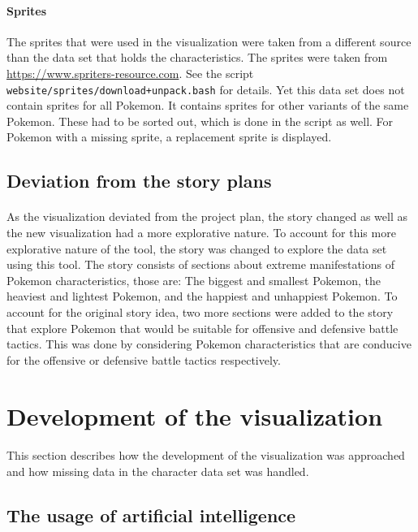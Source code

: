 \documentclass[12pt, a4paper]{article}
\begin{document}
			\paragraph{Sprites}
				The sprites that were used in the visualization were taken from a different source than the data set that holds the characteristics. The sprites were taken from \href{https://www.spriters-resource.com}{https://www.spriters-resource.com}. See the script \texttt{website/sprites/download+unpack.bash} for details. Yet this data set does not contain sprites for all Pokemon. It contains sprites for other variants of the same Pokemon. These had to be sorted out, which is done in the script as well. For Pokemon with a missing sprite, a replacement sprite is displayed.
		\subsection{Deviation from the story plans}
			\paragraph{}
				As the visualization deviated from the project plan, the story changed as well as the new visualization had a more explorative nature. To account for this more explorative nature of the tool, the story was changed to explore the data set using this tool. The story consists of sections about extreme manifestations of Pokemon characteristics, those are: The biggest and smallest Pokemon, the heaviest and lightest Pokemon, and the happiest and unhappiest Pokemon. To account for the original story idea, two more sections were added to the story that explore Pokemon that would be suitable for offensive and defensive battle tactics. This was done by considering Pokemon characteristics that are conducive for the offensive or defensive battle tactics respectively.
	\section{Development of the visualization}
		\paragraph{}
		This section describes how the development of the visualization was approached and how missing data in the character data set was handled.
		\subsection{The usage of artificial intelligence}
\end{document}
